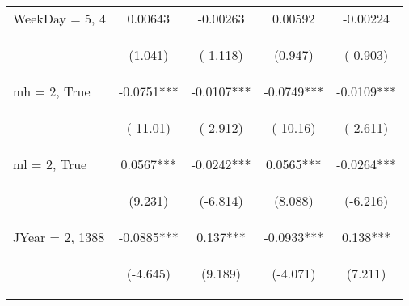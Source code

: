 \documentclass[]{article}
\begin{document}
\begin{center}
\begin{tabular}{lcccc}
WeekDay = 5, 4 & 0.00643 & -0.00263 & 0.00592 & -0.00224 \\
\vspace{4pt} & \begin{footnotesize}(1.041)\end{footnotesize} & \begin{footnotesize}(-1.118)\end{footnotesize} & \begin{footnotesize}(0.947)\end{footnotesize} & \begin{footnotesize}(-0.903)\end{footnotesize} \\
mh = 2, True & -0.0751*** & -0.0107*** & -0.0749*** & -0.0109*** \\
\vspace{4pt} & \begin{footnotesize}(-11.01)\end{footnotesize} & \begin{footnotesize}(-2.912)\end{footnotesize} & \begin{footnotesize}(-10.16)\end{footnotesize} & \begin{footnotesize}(-2.611)\end{footnotesize} \\
ml = 2, True & 0.0567*** & -0.0242*** & 0.0565*** & -0.0264*** \\
\vspace{4pt} & \begin{footnotesize}(9.231)\end{footnotesize} & \begin{footnotesize}(-6.814)\end{footnotesize} & \begin{footnotesize}(8.088)\end{footnotesize} & \begin{footnotesize}(-6.216)\end{footnotesize} \\
JYear = 2, 1388 & -0.0885*** & 0.137*** & -0.0933*** & 0.138*** \\
\vspace{4pt} & \begin{footnotesize}(-4.645)\end{footnotesize} & \begin{footnotesize}(9.189)\end{footnotesize} & \begin{footnotesize}(-4.071)\end{footnotesize} & \begin{footnotesize}(7.211)\end{footnotesize} \\

\end{tabular}
\end{center}
\end{document}
